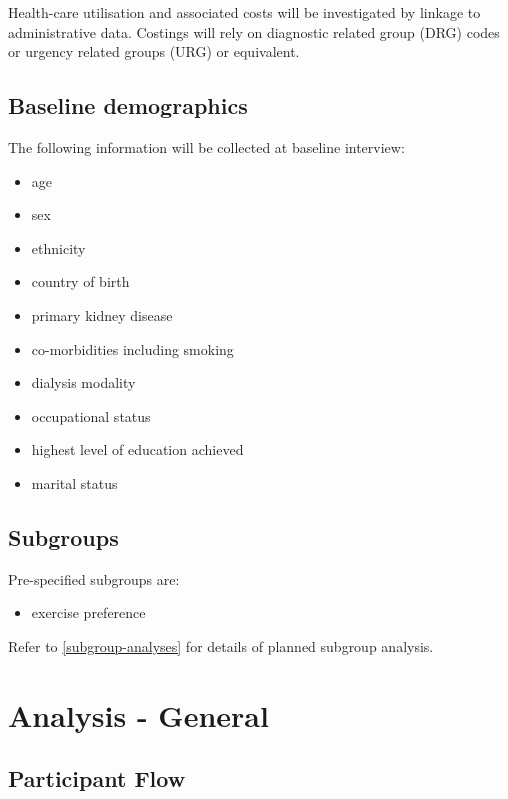 \documentclass[11pt,parskip=half-]{scrartcl}
\providecommand{\tightlist}{%
  \setlength{\itemsep}{0pt}\setlength{\parskip}{0pt}}
\begin{document}
Health-care utilisation and associated costs will be investigated by linkage to administrative data. Costings will rely on diagnostic related group (DRG) codes or urgency related groups (URG) or equivalent.

\subsection{Baseline demographics}\label{baseline}

The following information will be collected at baseline interview:

\begin{itemize}
  \tightlist
  \item age
  \item sex
  \item ethnicity
  \item country of birth
  \item primary kidney disease
  \item co-morbidities including smoking
  \item dialysis modality
  \item occupational status
  \item highest level of education achieved
  \item marital status
\end{itemize}

\subsection{Subgroups}\label{subgroups}

Pre-specified subgroups are:

\begin{itemize}
  \item exercise preference
\end{itemize}

Refer to \ref{subgroup-analyses} for details of planned subgroup analysis.

\clearpage


\section{Analysis - General}\label{analysis-general}

\subsection{Participant Flow}\label{participant-flow}
\end{document}
